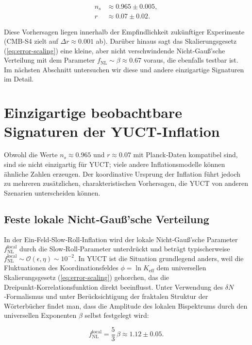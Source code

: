 \documentclass[12pt]{article}
\theoremstyle{remark}
\newcommand{\Keff}{K_{\mathrm{eff}}}
\newcommand{\rs}{r}
\begin{document}
	\begin{align}
		n_s &\approx 0.965 \pm 0.005, \\
		\rs &\approx 0.07 \pm 0.02.
	\end{align}
	
	Diese Vorhersagen liegen innerhalb der Empfindlichkeit zukünftiger Experimente (CMB‑S4 zielt auf $\Delta r \approx 0.001$ ab). Darüber hinaus sagt das Skalierungsgesetz (\ref{eq:error-scaling}) eine kleine, aber nicht verschwindende Nicht‑Gauß’sche Verteilung mit dem Parameter $f_{\mathrm{NL}} \sim \beta \approx 0.67$ voraus, die ebenfalls testbar ist. Im nächsten Abschnitt untersuchen wir diese und andere einzigartige Signaturen im Detail.
	
	\section{Einzigartige beobachtbare Signaturen der YUCT-Inflation}
	\label{sec:signatures}
	
	Obwohl die Werte $n_s \approx 0.965$ und $r \approx 0.07$ mit Planck‑Daten kompatibel sind, sind sie nicht einzigartig für YUCT; viele andere Inflationsmodelle können ähnliche Zahlen erzeugen. Der koordinative Ursprung der Inflation führt jedoch zu mehreren zusätzlichen, charakteristischen Vorhersagen, die YUCT von anderen Szenarien unterscheiden können.
	
	\subsection{Feste lokale Nicht‑Gauß’sche Verteilung}
	
	In der Ein‑Feld‑Slow‑Roll‑Inflation wird der lokale Nicht‑Gauß’sche Parameter $f_{\text{NL}}^{\text{local}}$ durch die Slow‑Roll‑Parameter unterdrückt und beträgt typischerweise $f_{\text{NL}}^{\text{local}} \sim \mathcal{O}(\epsilon, \eta) \sim 10^{-2}$. In YUCT ist die Situation grundlegend anders, weil die Fluktuationen des Koordinationsfeldes $\phi = \ln \Keff$ dem universellen Skalierungsgesetz (\ref{eq:error-scaling}) gehorchen, das die Dreipunkt‑Korrelationsfunktion direkt beeinflusst. Unter Verwendung des $\delta N$‑Formalismus und unter Berücksichtigung der fraktalen Struktur der Wörterbücher findet man, dass die Amplitude des lokalen Bispektrums durch den universellen Exponenten $\beta$ selbst festgelegt wird:
	
	\begin{equation}
		f_{\text{NL}}^{\text{local}} = \frac{5}{3}\,\beta \approx 1.12 \pm 0.05.
		\label{eq:fnl}
	\end{equation}
	
\end{document}
